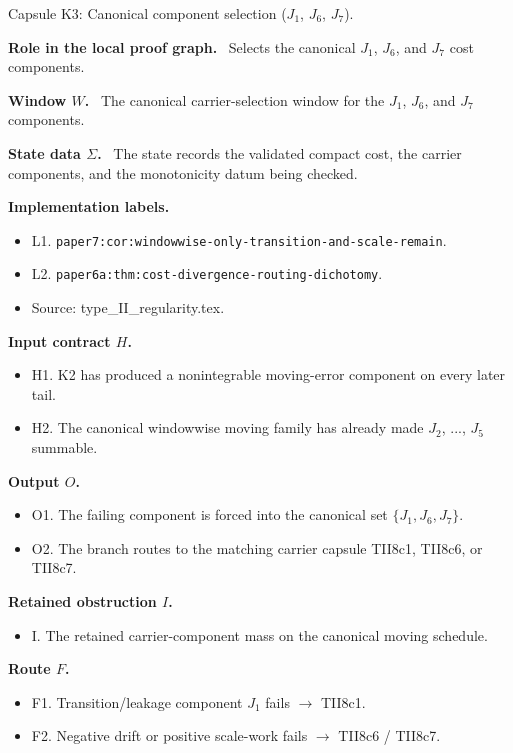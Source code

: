 \documentclass[11pt]{amsart}
\newcommand{\capsulefield}[1]{\par\smallskip\noindent\textbf{#1.}\ }
\begin{document}
\begin{proofcapsule}{Capsule K3: Canonical component selection ($J_1$, $J_6$, $J_7$).}
  \capsulefield{Role in the local proof graph}
  Selects the canonical \(J_1\), \(J_6\), and \(J_7\) cost components.

  \capsulefield{Window \(W\)}
The canonical carrier-selection window for the $J_1$, $J_6$, and $J_7$ components.

  \capsulefield{State data \(\Sigma\)}
The state records the validated compact cost, the carrier components, and the monotonicity datum being checked.

  \capsulefield{Implementation labels}
  \begin{itemize}[leftmargin=1.8em]
  \item L1. \texttt{paper7:cor:windowwise-only-transition-and-scale-remain}.
  \item L2. \texttt{paper6a:thm:cost-divergence-routing-dichotomy}.
  \item Source: type\_II\_regularity.tex.
  \end{itemize}

  \capsulefield{Input contract \(H\)}
  \begin{itemize}[leftmargin=1.8em]
  \item H1. K2 has produced a nonintegrable moving-error component on every later tail.
  \item H2. The canonical windowwise moving family has already made $J_2$, ..., $J_5$ summable.
  \end{itemize}

  \capsulefield{Output \(O\)}
  \begin{itemize}[leftmargin=1.8em]
  \item O1. The failing component is forced into the canonical set $\{J_1,J_6,J_7\}$.
  \item O2. The branch routes to the matching carrier capsule TII8c1, TII8c6, or TII8c7.
  \end{itemize}

  \capsulefield{Retained obstruction \(I\)}
  \begin{itemize}[leftmargin=1.8em]
  \item I. The retained carrier-component mass on the canonical moving schedule.
  \end{itemize}

  \capsulefield{Route \(F\)}
  \begin{itemize}[leftmargin=1.8em]
  \item F1. Transition/leakage component $J_1$ fails $\to$ TII8c1.
  \item F2. Negative drift or positive scale-work fails $\to$ TII8c6 / TII8c7.
  \end{itemize}


\end{proofcapsule}
\end{document}
